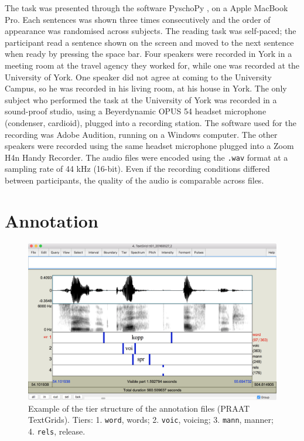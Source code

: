 \documentclass[11pt,a4paper,openany]{memoir}\usepackage[]{graphicx}\usepackage[]{color}
\begin{document}
The task was presented through the software PyschoPy \citep{peirce2009}, on a Apple MacBook Pro.
Each sentences was shown three times consecutively and the order of appearance was randomised across subjects.
The reading task was self-paced; the participant read a sentence shown on the screen and moved to the next sentence when ready by pressing the space bar.
Four speakers were recorded in York in a meeting room at the travel agency they worked for, while one was recorded at the University of York.
One speaker did not agree at coming to the University Campus, so he was recorded in his living room, at his house in York.
The only subject who performed the task at the University of York was recorded in a sound-proof studio, using a Beyerdynamic OPUS 54 headset microphone (condenser, cardioid), plugged into a recording station.
The software used for the recording was Adobe Audition, running on a Windows computer.
The other speakers were recorded using the same headset microphone plugged into a Zoom H4n Handy Recorder.
The audio files were encoded using the \texttt{.wav} format at a sampling rate of 44 kHz (16-bit).
Even if the recording conditions differed between participants, the quality of the audio is comparable across files.

\section{Annotation}
\label{s:annotation}

\begin{figure}
\centering
\includegraphics[width=\textwidth]{textgrid}
\caption{Example of the tier structure of the annotation files (PRAAT TextGrids). Tiers: 1. \texttt{word}, words; 2. \texttt{voic}, voicing; 3. \texttt{mann}, manner; 4. \texttt{rels}, release.}
\label{f:textgrid}
\end{figure}
\end{document}
